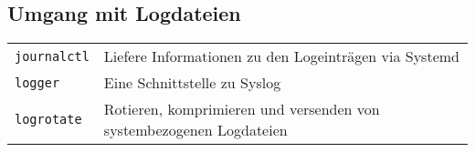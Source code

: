 \documentclass[10pt,a4paper]{article}
\begin{document}
\begin{multicols}{2}
\section{Umgang mit Logdateien}
\begin{tabular}{ p{2.5cm} p{8.5cm} }
  \hline
  \texttt{journalctl} & Liefere Informationen zu den Logeinträgen via Systemd \\
  \texttt{logger} & Eine Schnittstelle zu Syslog \\
  \texttt{logrotate} & Rotieren, komprimieren und versenden von  systembezogenen Logdateien \\
  \hline
\end{tabular}

\end{multicols}

\newpage

\cheatsheet
\end{document}
